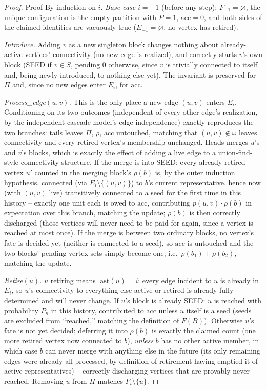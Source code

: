 \documentclass[ijoc,sglanonrev]{informs4}
\newcommand{\FF}{F}
\begin{document}
\begin{proof}{Proof}
By induction on $i$. \emph{Base case} $i=-1$ (before any step): $F_{-1}
=\varnothing$, the unique configuration is the empty partition with $P=1$,
$\mathrm{acc}=0$, and both sides of the claimed identities are vacuously
true ($E_{-1}=\varnothing$, no vertex has retired).

\emph{Introduce.} Adding $v$ as a new singleton block changes nothing about
already-active vertices' connectivity (no new edge is realized), and
correctly starts $v$'s own block (SEED if $v\in S$, pending $0$ otherwise,
since $v$ is trivially connected to itself and, being newly introduced, to
nothing else yet). The invariant is preserved for $\Pi$ and, since no new
edges enter $E_i$, for $\mathrm{acc}$.

\emph{Process\_edge$(u,v)$.} This is the only place a new edge $(u,v)$
enters $E_i$. Conditioning on its two outcomes (independent of every other
edge's realization, by the independent-cascade model's edge independence)
exactly reproduces the two branches: tails leaves $\Pi$, $\rho$,
$\mathrm{acc}$ untouched, matching that $(u,v)\notin\omega$ leaves
connectivity and every retired vertex's membership unchanged. Heads merges
$u$'s and $v$'s blocks, which is exactly the effect of adding a live edge to
a union-find-style connectivity structure. If the merge is into SEED: every
already-retired vertex $u'$ counted in the merging block's $\rho(b)$ is, by
the outer induction hypothesis, connected (via $E_i\setminus\{(u,v)\}$) to
$b$'s current representative, hence now (with $(u,v)$ live) transitively
connected to a seed for the first time in this history -- exactly one unit
each is owed to $\mathrm{acc}$, contributing $p(u,v)\cdot\rho(b)$ in
expectation over this branch, matching the update; $\rho(b)$ is then
correctly discharged (those vertices will never need to be paid for again,
since a vertex is reached at most once). If the merge is between two
ordinary blocks, no vertex's fate is decided yet (neither is connected to a
seed), so $\mathrm{acc}$ is untouched and the two blocks' pending vertex
sets simply become one, i.e.\ $\rho(b_1)+\rho(b_2)$, matching the update.

\emph{Retire$(u)$.} $u$ retiring means $\mathrm{last}(u)=i$: every edge
incident to $u$ is already in $E_i$, so $u$'s connectivity to everything
else active or retired is already fully determined and will never change.
If $u$'s block is already SEED: $u$ is reached with probability $P_\kappa$
in this history, contributed to $\mathrm{acc}$ unless $u$ itself is a seed
(seeds are excluded from ``reached,'' matching the definition of
$\FF(B)$). Otherwise $u$'s fate is not yet decided; deferring it into
$\rho(b)$ is exactly the claimed count (one more retired vertex now
connected to $b$), \emph{unless} $b$ has no other active member, in which
case $b$ can never merge with anything else in the future (its only
remaining edges were already all processed, by definition of retirement
having emptied it of active representatives) -- correctly discharging
vertices that are provably never reached. Removing $u$ from $\Pi$ matches
$F_i\setminus\{u\}$.\Halmos
\end{proof}
\end{document}
